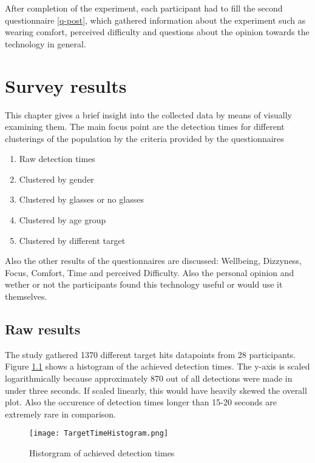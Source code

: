             After completion of the experiment, each participant had to fill the second questionnaire \ref*{q-post}, which gathered information about the experiment such as wearing comfort, perceived difficulty and questions about the opinion towards the technology in general. 

    \chapter{Survey results}\label{raw-results}

        This chapter gives a brief insight into the collected data by means of visually examining them. The main focus point are the detection times for different clusterings of the population by the criteria provided by the questionnaires

        \begin{enumerate}
            \item Raw detection times
            \item Clustered by gender
            \item Clustered by glasses or no glasses
            \item Clustered by age group
            \item Clustered by different target
        \end{enumerate}

        Also the other results of the questionnaires are discussed: Wellbeing, Dizzyness, Focus, Comfort, Time and perceived Difficulty. Also the personal opinion and wether or not the participants found this technology useful or would use it themselves.

        \section{Raw results}

            The study gathered 1370 different target hits datapoints from 28 participants. Figure \ref*{time-hist} shows a histogram of the achieved detection times. The y-axis is scaled logarithmically because approximately 870 out of all detections were made in under three seconds. If scaled linearly, this would have heavily skewed the overall plot. Also the occurence of detection times longer than 15-20 seconds are extremely rare in comparison.

            \begin{figure}[h]     %
                \centering
                \texttt{[image: TargetTimeHistogram.png]} 
                \caption{Historgram of achieved detection times}\label{time-hist}
            \end{figure}    
            

